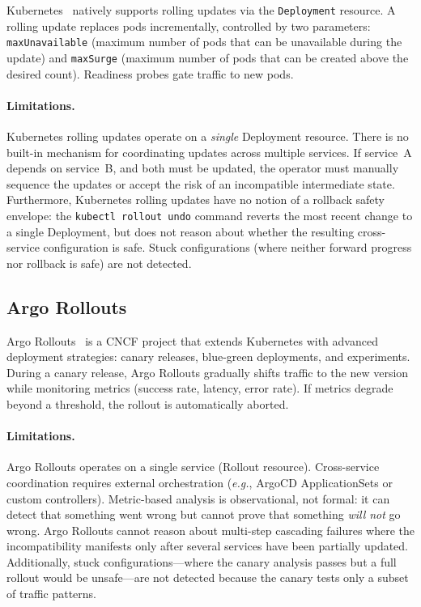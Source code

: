 \documentclass[10pt,twocolumn]{article}
\newcommand{\eg}{\textit{e.g.}}
\begin{document}
Kubernetes~\cite{k8s-deployments} natively supports rolling
updates via the \texttt{Deployment} resource. A rolling update
replaces pods incrementally, controlled by two parameters:
\texttt{maxUnavailable} (maximum number of pods that can be
unavailable during the update) and \texttt{maxSurge} (maximum
number of pods that can be created above the desired count).
Readiness probes gate traffic to new pods.

\paragraph{Limitations.}
Kubernetes rolling updates operate on a \emph{single} Deployment
resource. There is no built-in mechanism for coordinating updates
across multiple services. If service~A depends on service~B,
and both must be updated, the operator must manually sequence the
updates or accept the risk of an incompatible intermediate state.
Furthermore, Kubernetes rolling updates have no notion of a
rollback safety envelope: the \texttt{kubectl rollout undo}
command reverts the most recent change to a single Deployment,
but does not reason about whether the resulting cross-service
configuration is safe. Stuck configurations (where neither
forward progress nor rollback is safe) are not detected.

\subsection{Argo Rollouts}

Argo Rollouts~\cite{argo-rollouts} is a CNCF project that extends
Kubernetes with advanced deployment strategies: canary releases,
blue-green deployments, and experiments. During a canary release,
Argo Rollouts gradually shifts traffic to the new version while
monitoring metrics (success rate, latency, error rate). If metrics
degrade beyond a threshold, the rollout is automatically aborted.

\paragraph{Limitations.}
Argo Rollouts operates on a single service (Rollout resource).
Cross-service coordination requires external orchestration
(\eg, ArgoCD ApplicationSets or custom controllers). Metric-based
analysis is observational, not formal: it can detect that
something went wrong but cannot prove that something \emph{will
not} go wrong. Argo Rollouts cannot reason about multi-step
cascading failures where the incompatibility manifests only after
several services have been partially updated. Additionally, stuck
configurations---where the canary analysis passes but a full
rollout would be unsafe---are not detected because the canary
tests only a subset of traffic patterns.
\end{document}

